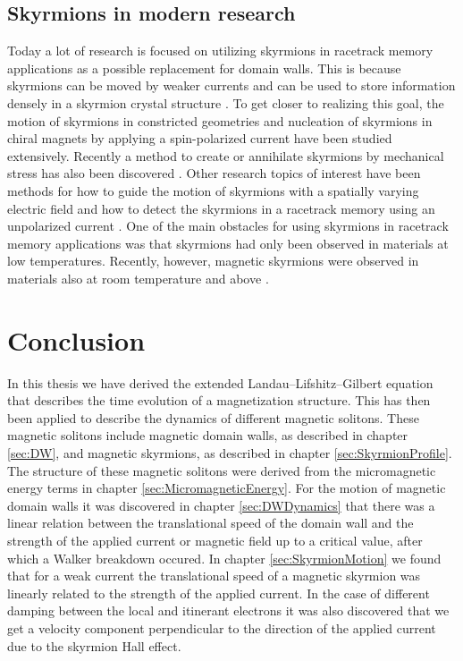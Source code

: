 \documentclass[12pt, a4paper, twoside, openright]{article}		%
\let\oldsection\section
\def\section{\cleardoublepage\oldsection}
\numberwithin{equation}{section}
\begin{document}
\subsection{Skyrmions in modern research}
Today a lot of research is focused on utilizing skyrmions in racetrack memory applications \cite{Parkin2008} as a possible replacement for domain walls. This is because skyrmions can be moved by weaker currents and can be used to store information densely in a skyrmion crystal structure \cite{Fert2013}. To get closer to realizing this goal, the motion of skyrmions in constricted geometries \cite{Iwasaki2013} and nucleation of skyrmions in chiral magnets by applying a spin-polarized current \cite{Sampaio2013} have been studied extensively. Recently a method to create or annihilate skyrmions by mechanical stress has also been discovered \cite{Nii2015}. Other research topics of interest have been methods for how to guide the motion of skyrmions with a spatially varying electric field \cite{Upadhyaya2015} and how to detect the skyrmions in a racetrack memory using an unpolarized current \cite{Monchesky2015}. One of the main obstacles for using skyrmions in racetrack memory applications was that skyrmions had only been observed in materials at low temperatures. Recently, however, magnetic skyrmions were observed in materials also at room temperature \cite{Woo2015} and above \cite{Tokunaga2015}.


\section{Conclusion}
In this thesis we have derived the extended Landau--Lifshitz--Gilbert equation that describes the time evolution of a magnetization structure. This has then been applied to describe the dynamics of different magnetic solitons. These magnetic solitons include magnetic domain walls, as described in chapter \ref{sec:DW}, and magnetic skyrmions, as described in chapter \ref{sec:SkyrmionProfile}. The structure of these magnetic solitons were derived from the micromagnetic energy terms in chapter \ref{sec:MicromagneticEnergy}. For the motion of magnetic domain walls it was discovered in chapter \ref{sec:DWDynamics} that there was a linear relation between the translational speed of the domain wall and the strength of the applied current or magnetic field up to a critical value, after which a Walker breakdown occured. In chapter \ref{sec:SkyrmionMotion} we found that for a weak current the translational speed of a magnetic skyrmion was linearly related to the strength of the applied current. In the case of different damping between the local and itinerant electrons it was also discovered that we get a velocity component perpendicular to the direction of the applied current due to the skyrmion Hall effect.
\end{document}
